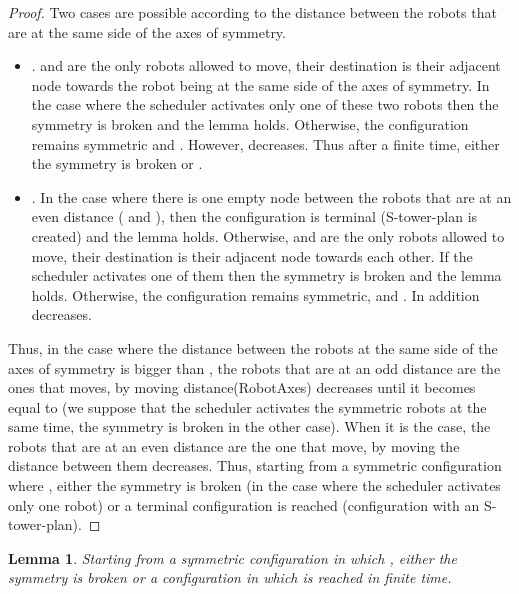 \documentclass[12pt]{llncs}
\newtheorem{lem}{Lemma}
\begin{document}
\begin{proof}
Two cases are possible according to the distance between the robots that are at the same side of the axes of symmetry. 
\begin{itemize}
\item{.  and  are the only robots allowed to move, their destination is their adjacent node towards the robot being at the same side of the axes of symmetry. In the case where the scheduler activates only one of these two robots then the symmetry is broken and the lemma holds. Otherwise, the configuration remains symmetric and . However,  decreases. Thus after a finite time, either the symmetry is broken or .}
\item{. In the case where there is one empty node between the robots that are at an even distance ( and ), then the configuration is terminal (S-tower-plan is created) and the lemma holds. Otherwise,  and  are the only robots allowed to move, their destination is their adjacent node towards each other. If the scheduler activates one of them then the symmetry is broken and the lemma holds. Otherwise, the configuration remains symmetric,  and . In addition  decreases.}
\end{itemize}
Thus, in the case where the distance between the robots at the same side of the axes of symmetry is bigger than , the robots that are at an odd distance are the ones that moves, by moving distance(RobotAxes) decreases until it becomes equal to  (we suppose that the scheduler activates the symmetric robots at the same time, the symmetry is broken in the other case). When it is the case, the robots that are at an even distance are the one that move, by moving the distance between them decreases. Thus, starting from a symmetric configuration where , either the symmetry is broken (in the case where the scheduler activates only one robot) or a terminal configuration is reached (configuration with an S-tower-plan). 
\end{proof}
\begin{lem}
\label{lem:EvOd1}
Starting from a symmetric configuration in which , either the symmetry is broken or a configuration in which  is reached in finite time. 
\end{lem}
\end{document}
